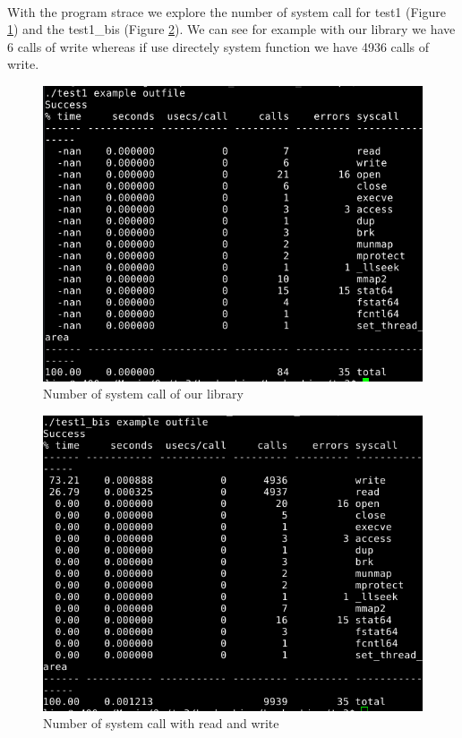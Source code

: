 \documentclass[a4paper,10pt]{article}
\begin{document}
\paragraph{} With the program strace we explore
the number of system call for test1 (Figure \ref{our}) and the 
test1\_bis (Figure \ref{sys}). We can see for example with our library
we have 6 calls of write whereas if use directely system function we have
4936 calls of write. 
 \begin{figure}[ht]
 \center 
 \includegraphics[width=0.85\linewidth]{my_strace.png}
 \caption{Number of system call of our library}
 \label{our}
 \end{figure}
 \begin{figure}[ht]
 \center 
 \includegraphics[width=0.85\linewidth]{syscall_strace.png}
 \caption{Number of system call with read and write}
 \label{sys}
 \end{figure}
 
\end{document}
